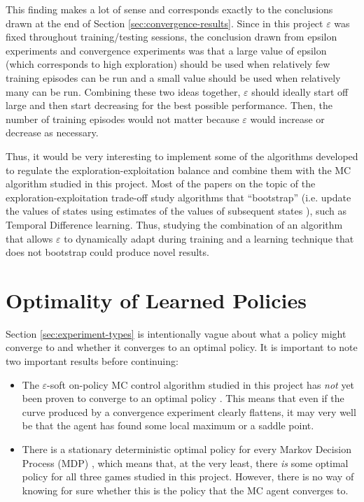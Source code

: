 \documentclass[11pt,a4paper]{report}
\begin{document}
This finding makes a lot of sense and corresponds exactly to the conclusions drawn at the end of Section \ref{sec:convergence-results}. Since in this project $\varepsilon$ was fixed throughout training/testing sessions, the conclusion drawn from epsilon experiments and convergence experiments was that a large value of epsilon (which corresponds to high exploration) should be used when relatively few training episodes can be run and a small value should be used when relatively many can be run. Combining these two ideas together, $\varepsilon$ should ideally start off large and then start decreasing for the best possible performance. Then, the number of training episodes would not matter because $\varepsilon$ would increase or decrease as necessary.

Thus, it would be very interesting to implement some of the algorithms developed to regulate the exploration-exploitation balance and combine them with the MC algorithm studied in this project. Most of the papers on the topic of the exploration-exploitation trade-off study algorithms that ``bootstrap'' (i.e. update the values of states using estimates of the values of subsequent states \cite{rl-book}), such as Temporal Difference learning. Thus, studying the combination of an algorithm that allows $\varepsilon$ to dynamically adapt during training and a learning technique that does not bootstrap could produce novel results.


\section{Optimality of Learned Policies}
\label{sec:policy-optimality}

Section \ref{sec:experiment-types} is intentionally vague about what a policy might converge to and whether it converges to an optimal policy. It is important to note two important results before continuing:

\begin{itemize}
    \item The $\varepsilon$-soft on-policy MC control algorithm studied in this project has \emph{not} yet been proven to converge to an optimal policy \cite{open-rl-questions}. This means that even if the curve produced by a convergence experiment clearly flattens, it may very well be that the agent has found some local maximum or a saddle point.
    \item There is a stationary deterministic optimal policy for every Markov Decision Process (MDP) \cite{mdp-convergence}, which means that, at the very least, there \emph{is} some optimal policy for all three games studied in this project. However, there is no way of knowing for sure whether this is the policy that the MC agent converges to.
\end{itemize}
\end{document}
